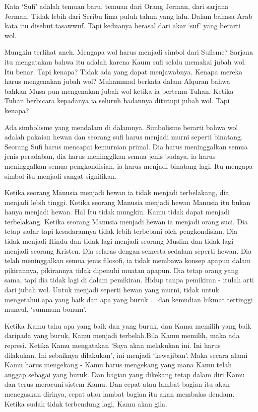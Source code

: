 Kata ‘Sufi’ adalah temuan baru, temuan dari Orang Jerman, dari sarjana Jerman. Tidak lebih dari
Seribu lima puluh tahun yang lalu. Dalam bahasa Arab kata itu disebut tasawwuf. Tapi keduanya berasal dari akar ‘suf’ yang berarti wol.

Mungkin terlihat aneh. Mengapa wol harus menjadi simbol dari Sufisme? Sarjana itu mengatakan bahwa itu adalah karena Kaum sufi selalu memakai jubah wol. Itu benar. Tapi kenapa? Tidak ada yang dapat menjawabnya. Kenapa mereka harus mengenakan jubah wol? Muhammad berkata dalam Alquran bahwa bahkan Musa pun mengenakan jubah wol ketika ia bertemu Tuhan. Ketika Tuhan berbicara kepadanya ia seluruh badannya ditutupi jubah wol. Tapi kenapa?

Ada simbolisme yang mendalam di dalamnya. Simbolisme berarti bahwa wol adalah pakaian hewan dan seorang sufi harus menjadi murni seperti binatang. Seorang Sufi harus mencapai kemurnian primal. Dia harus meninggalkan semua jenis peradaban, dia harus meningglkan semua jenis budaya, ia harus meninggalkan semua pengkondisian, ia harus menjadi binatang lagi. Itu mengapa simbol itu menjadi sangat signifikan.

Ketika seorang Manusia menjadi hewan ia tidak menjadi terbelakang, dia menjadi lebih tinggi. Ketika seorang Manusia menjadi hewan Manusia itu bukan hanya menjadi hewan. Hal Itu tidak mungkin. Kamu tidak dapat menjadi terbelakang. Ketika seorang Manusia menjadi hewan ia menjadi orang suci. Dia tetap sadar tapi kesadarannya tidak lebih terbebani oleh pengkondisian. Dia tidak menjadi Hindu dan tidak lagi menjadi seorang Muslim dan tidak lagi menjadi seorang Kristen. Dia selaras dengan semesta sedalam seperti hewan. Dia telah meninggalkan semua jenis filosofi, ia tidak membawa konsep apapun dalam pikirannya, pikirannya tidak dipenuhi muatan apapun. Dia tetap orang yang sama, tapi dia tidak lagi di dalam pemikiran. Hidup tanpa pemikiran - itulah arti dari jubah wol. Untuk menjadi seperti hewan yang murni, tidak untuk mengetahui apa yang baik dan apa yang buruk ... dan kemudian hikmat tertinggi muncul, ‘summum bonum’.

Ketika Kamu tahu apa yang baik dan yang buruk, dan Kamu memilih yang baik daripada yang buruk, Kamu menjadi terbelah.Bila Kamu memilih, maka ada represi. Ketika Kamu mengatakan ‘Saya akan melakukan ini. Ini harus dilakukan. Ini sebaiknya dilakukan’, ini menjadi ‘kewajiban’. Maka secara alami Kamu harus mengekang - Kamu harus mengekang yang mana Kamu telah anggap sebagai yang buruk. Dan bagian yang dikekang tetap dalam diri Kamu dan terus meracuni sistem Kamu. Dan cepat atau lambat bagian itu akan menegaskan dirinya, cepat atau lambat bagian itu akan membalas dendam. Ketika sudah tidak terbendung lagi, Kamu akan gila.

